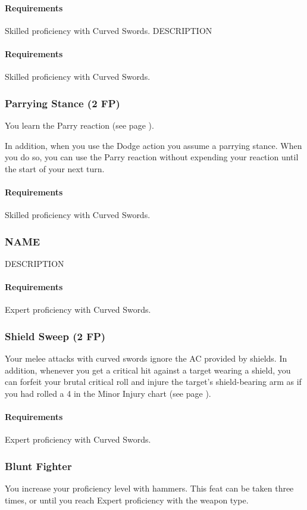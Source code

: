     \paragraph{Requirements} Skilled proficiency with Curved Swords.
    DESCRIPTION
    \paragraph{Requirements} Skilled proficiency with Curved Swords.
\subsubsection{Parrying Stance (2 FP)} \label{feat::parryingstance}
    You learn the Parry reaction (see page \pageref{act::parry}).

    In addition, when you use the Dodge action you assume a parrying stance.
    When you do so, you can use the Parry reaction without expending your reaction until the start of your next turn.
    \paragraph{Requirements} Skilled proficiency with Curved Swords.
\subsubsection{NAME} \label{feat::name}
    DESCRIPTION
    \paragraph{Requirements} Expert proficiency with Curved Swords.
\subsubsection{Shield Sweep (2 FP)} \label{feat::shieldsweep}
    Your melee attacks with curved swords ignore the AC provided by shields.
    In addition, whenever you get a critical hit against a target wearing a shield, you can forfeit your brutal critical roll and injure the target's shield-bearing arm as if you had rolled a 4 in the Minor Injury chart (see page \pageref{ssec::injuriesandinsanity}).
    \paragraph{Requirements} Expert proficiency with Curved Swords.
\subsubsection{Blunt Fighter} \label{feat::bluntfighter}
    You increase your proficiency level with hammers.
    This feat can be taken three times, or until you reach Expert proficiency with the weapon type.
